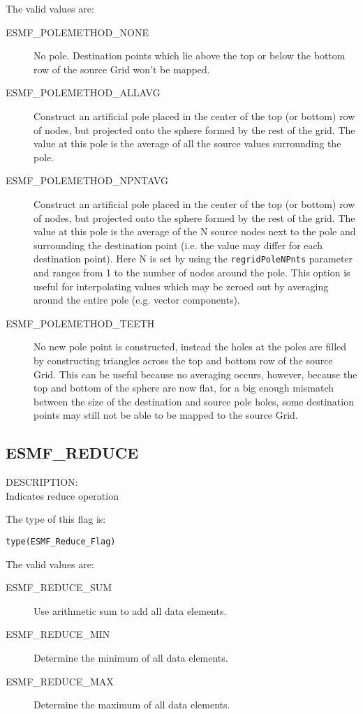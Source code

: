 The valid values are:
\begin{description}
\item [ESMF\_POLEMETHOD\_NONE]
      No pole. Destination points which lie above the top or below the bottom row of the source Grid won't be mapped. 
\item [ESMF\_POLEMETHOD\_ALLAVG]
      Construct an artificial pole placed in the center of the top (or bottom) row of nodes, but projected onto the sphere formed by the rest of the grid. The value at this pole is the average of all the source values surrounding the pole.
\item [ESMF\_POLEMETHOD\_NPNTAVG] Construct an artificial pole placed in the center of the top (or bottom) row of nodes, but projected onto the sphere formed by the rest of the grid. The value at this pole is the average of the N source nodes next to the pole and surrounding the destination point (i.e. the value may differ for each destination point). Here N is set by using the {\tt regridPoleNPnts} parameter and ranges from 1 to the number of nodes around the pole. This option is useful for interpolating values which may be zeroed out by averaging around the entire pole (e.g. vector components). 
\item [ESMF\_POLEMETHOD\_TEETH]
    No new pole point is constructed, instead the holes at the poles are filled by constructing triangles across the top and bottom row of the source Grid. This can be useful because no averaging occurs, however, because the top and bottom of the sphere are now flat, for a big enough mismatch between the size of the destination and source pole holes, some destination points may still not be able to be mapped to the source Grid. 
\end{description}

\subsection{ESMF\_REDUCE}
\label{const:reduce}
{\sf DESCRIPTION:\\}
Indicates reduce operation

The type of this flag is:

{\tt type(ESMF\_Reduce\_Flag)}

The valid values are:
\begin{description}
   \item [ESMF\_REDUCE\_SUM]
         Use arithmetic sum to add all data elements.
   \item [ESMF\_REDUCE\_MIN]
         Determine the minimum of all data elements.
   \item [ESMF\_REDUCE\_MAX]
         Determine the maximum of all data elements.
\end{description}

